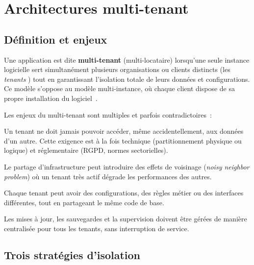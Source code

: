 \section{Architectures multi-tenant}
\label{sec:multi-tenant}

\subsection{Définition et enjeux}
\label{subsec:multitenant-def}

Une application est dite \textbf{multi-tenant} (multi-locataire) lorsqu'une seule instance
logicielle sert simultanément plusieurs organisations ou clients distincts (les
\textit{tenants} ) tout en garantissant l'isolation totale de leurs données et
configurations. Ce modèle s'oppose au modèle multi-instance, où chaque client dispose de
sa propre installation du logiciel~\cite{multitenant}.

Les enjeux du multi-tenant sont multiples et parfois contradictoires~:

\begin{description}[leftmargin=0.5cm]
  \item[\textbf{Isolation des données}]
    Un tenant ne doit jamais pouvoir accéder, même accidentellement, aux données d'un
    autre. Cette exigence est à la fois technique (partitionnement physique ou logique) et
    réglementaire (RGPD, normes sectorielles).

  \item[\textbf{Performance et scalabilité}]
    Le partage d'infrastructure peut introduire des effets de voisinage
    (\textit{noisy neighbor problem}) où un tenant très actif dégrade les performances
    des autres.

  \item[\textbf{Personnalisation}]
    Chaque tenant peut avoir des configurations, des règles métier ou des interfaces
    différentes, tout en partageant le même code de base.

  \item[\textbf{Opérabilité}]
    Les mises à jour, les sauvegardes et la supervision doivent être gérées de manière
    centralisée pour tous les tenants, sans interruption de service.
\end{description}

\subsection{Trois stratégies d'isolation}
\label{subsec:isolation-strategies}

